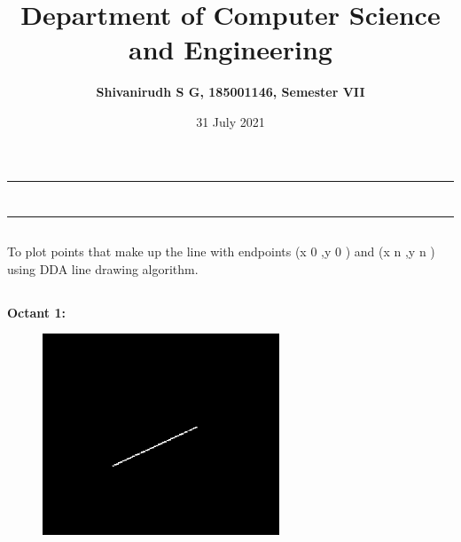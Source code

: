 \documentclass[12pt,letterpaper]{article}
\title{\textbf{Department of Computer Science and Engineering}}
\author{\textbf{Shivanirudh S G, 185001146, Semester VII }}
\date{31 July 2021}
\begin{document}
\maketitle
\hrule
\section*{}
\hrule 
\bigskip\bigskip

\subsection*{}

\subsection*{}
\begin{flushleft}
    To plot points that make up the line with endpoints (x 0 ,y 0 ) and (x n ,y n ) using DDA line drawing algorithm.   
\end{flushleft}

\subsection*{}
\begin{flushleft}




\end{flushleft}
\newpage
\subsection*{}
\textbf{Octant 1:}
\begin{figure}[h]
    \centering
    \includegraphics[height=6cm]{Outputs/O1-1.png}
\end{figure}
\end{document}
